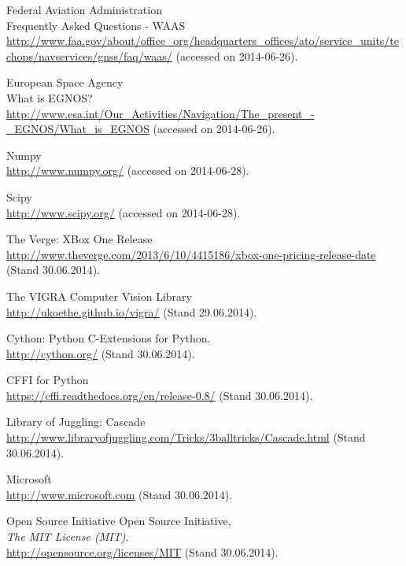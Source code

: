 \documentclass[12pt,a4paper,ngerman]{scrartcl}
\begin{document}
\begin{thebibliography}{99}
Federal Aviation Administration\\
Frequently Asked Questions - WAAS\\
\url{http://www.faa.gov/about/office_org/headquarters_offices/ato/service_units/techops/navservices/gnss/faq/waas/} (accessed on 2014-06-26).

European Space Agency\\
What is EGNOS?
\url{http://www.esa.int/Our_Activities/Navigation/The_present_-_EGNOS/What_is_EGNOS} (accessed on 2014-06-26).

Numpy\\
\url{http://www.numpy.org/} (accessed on 2014-06-28).

Scipy\\
\url{http://www.scipy.org/} (accessed on 2014-06-28).

The Verge: XBox One Release\\
\url{http://www.theverge.com/2013/6/10/4415186/xbox-one-pricing-release-date} (Stand 30.06.2014).

The VIGRA Computer Vision Library\\
\url{http://ukoethe.github.io/vigra/} (Stand 29.06.2014).

Cython: Python C-Extensions for Python.\\
\url{http://cython.org/} (Stand 30.06.2014).

CFFI for Python\\
\url{https://cffi.readthedocs.org/en/release-0.8/} (Stand 30.06.2014).

Library of Juggling: Cascade\\
\url{http://www.libraryofjuggling.com/Tricks/3balltricks/Cascade.html} (Stand 30.06.2014).

Microsoft\\
\url{http://www.microsoft.com} (Stand 30.06.2014).

Open Source Initiative Open Source Initiative,\\
\emph{The MIT License (MIT)}.\\
\url{http://opensource.org/licenses/MIT} (Stand 30.06.2014).
\end{thebibliography}
\end{document}
